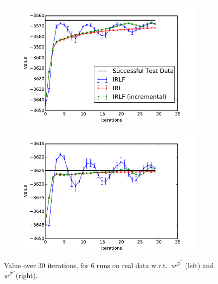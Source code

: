 \documentclass{aamas2016}
\begin{document}
\begin{figure}[t]
  \begin{subfigure}[b]{0.495\columnwidth}
    \includegraphics[trim=0.5cm 0.5cm 0.2cm 0.2,clip=true,width=\textwidth]{images/expert_apprentice_real.pdf}
    \label{fig:real_expert_apprentice}
  \end{subfigure}
  \begin{subfigure}[b]{0.495\columnwidth}
    \includegraphics[trim=0.5cm 0.5cm 0.2cm 0.2,clip=true,width=\textwidth]{images/taboo_apprentice_real.pdf}
    \label{fig:real_taboo_apprentice}
  \end{subfigure}  
  \caption{\small{Value over 30 iterations, for 6 runs on real data w.r.t.\ $w^{\mathcal{D}^*}$ (left) and $w^{\mathcal{F}^*}$(right).}}
  \label{fig:real_data}
\end{figure}
\end{document}
